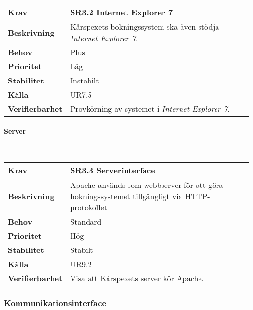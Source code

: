 \documentclass[a4paper, twoside, 11pt, titlepage]{article}
\begin{document}
			\begin {table} [ht] \begin{tabular} { p{2.6cm} p{12.5cm} }
				\hline
				\sffamily\textbf{Krav} & \sffamily\textbf{SR3.2 Internet Explorer 7 } \\
				\hline
				\sffamily\textbf{Beskrivning} & Kårspexets bokningssystem ska även stödja \emph{Internet Explorer 7}.  \\
				\hline
				\sffamily\textbf{Behov} & Plus  \\
				\hline
				\sffamily\textbf{Prioritet} & Låg  \\
				\hline
				\sffamily\textbf{Stabilitet} & Instabilt  \\
				\hline
				\sffamily\textbf{Källa} & UR7.5  \\
				\hline
				\sffamily\textbf{Verifierbarhet} & Provkörning av systemet i \emph{Internet Explorer 7}.  \\
				\hline
			\end{tabular} \end{table} \FloatBarrier


			\paragraph{Server}\

			\begin {table} [ht] \begin{tabular} { p{2.6cm} p{12.5cm} }
				\hline
				\sffamily\textbf{Krav} & \sffamily\textbf{SR3.3 Serverinterface } \\
				\hline
				\sffamily\textbf{Beskrivning} & Apache används som webbserver för att göra bokningssystemet tillgängligt via HTTP-protokollet.  \\
				\hline
				\sffamily\textbf{Behov} & Standard  \\
				\hline
				\sffamily\textbf{Prioritet} & Hög  \\
				\hline
				\sffamily\textbf{Stabilitet} & Stabilt  \\
				\hline
				\sffamily\textbf{Källa} & UR9.2  \\
				\hline
				\sffamily\textbf{Verifierbarhet} & Visa att Kårspexets server kör Apache.  \\
				\hline
			\end{tabular} \end{table} \FloatBarrier


		\subsubsection{Kommunikationsinterface}
\end{document}
